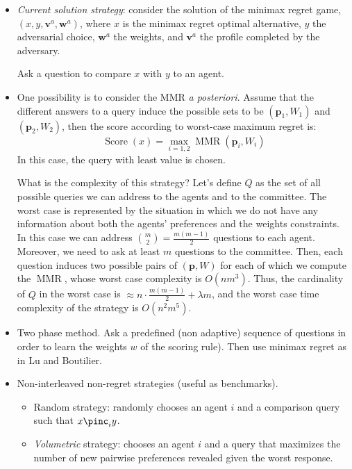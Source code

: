 \documentclass[12pt]{article}
\newcommand{\profile}{\textbf{v}}%
\newcommand{\pprofile}{\textbf{p}}%
\newcommand{\w}{\textbf{w}}%
\DeclareMathOperator{\SCORE}{Score}
\DeclareMathOperator{\MMR}{MMR}
\begin{document}
\begin{itemize}
\item {\em Current solution strategy}: consider the solution of the minimax regret game, 
 $(x,y,\profile^{a},\w^{a})$, where $x$ is the minimax regret optimal alternative, $y$ the adversarial choice, $\w^{a}$ the weights, and $\profile^{a}$ the profile completed by the adversary.

Ask a question to compare $x$ with $y$ to an agent.

 
 \item One possibility is to consider the MMR {\em a posteriori}. Assume that the different answers to a query induce the possible sets to be $(\pprofile_1,W_1)$ and $(\pprofile_2,W_2)$, then the score according to worst-case maximum regret is:
\[\SCORE(x)= \max_{i=1,2} \MMR(\pprofile_i,W_i) \]
In this case, the query with least value is chosen.

What is the complexity of this strategy? Let's define $Q$ as the set of all possible queries we can address to the agents and to the committee. The worst case is represented by the situation in which we do not have any information about both the agents' preferences and the weights constraints. In this case we can address $\binom{m}{2}=\frac{m(m-1)}{2}$ questions to each agent. Moreover, we need to ask at least $m$ questions to the committee. Then, each question induces two possible pairs of $(\pprofile,W)$ for each of which we compute the $\MMR$, whose worst case complexity is $O(nm^3)$. Thus, the cardinality of $Q$ in the worst case is $\approx n \cdot \frac{m(m-1)}{2} + \lambda m$, and the worst case time complexity of the strategy is $O(n^2m^5)$.

\item Two phase method.
Ask a predefined (non adaptive) sequence of questions in order to learn the weights $w$ of the scoring rule).
Then use minimax regret as in Lu and Boutilier.


\item Non-interleaved non-regret strategies (useful as benchmarks).	
	\begin{itemize}
		\item Random strategy: randomly chooses an agent $i$ and a comparison query such that $x \pinc_i y$.
		\item {\em Volumetric} strategy: chooses an agent $i$ and a query that maximizes the number of new pairwise preferences revealed given the worst response.
	\end{itemize}
\end{itemize}
\end{document}
